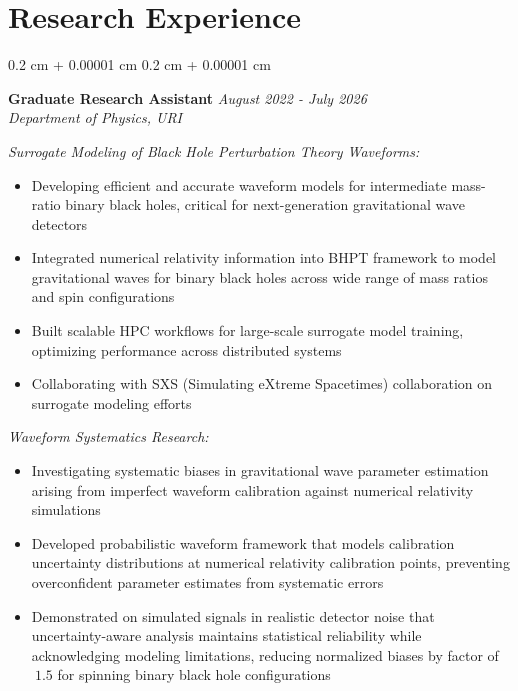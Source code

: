 \documentclass[10pt, letterpaper]{article}
\newenvironment{highlights}{
    \begin{itemize}[
        topsep=0.10 cm,
        parsep=0.10 cm,
        partopsep=0pt,
        itemsep=0pt,
        leftmargin=0.4 cm + 10pt
    ]
}{
    \end{itemize}
}
\newenvironment{onecolentry}{
    \begin{adjustwidth}{
        0.2 cm + 0.00001 cm
    }{
        0.2 cm + 0.00001 cm
    }
}{
    \end{adjustwidth}
}
\begin{document}
\section{Research Experience}

\begin{onecolentry}
  \textbf{Graduate Research Assistant} \hfill \textit{August 2022 - July 2026}\\
  \textit{Department of Physics, URI}
  
  \vspace{0.1 cm}

  \textit{Surrogate Modeling of Black Hole Perturbation Theory Waveforms:}
  \begin{highlights}
    \item Developing efficient and accurate waveform models for intermediate mass-ratio 
    binary black holes, critical for next-generation gravitational wave detectors
    \item Integrated numerical relativity information into BHPT framework to model 
    gravitational waves for binary black holes across wide range of mass ratios and spin 
    configurations
    \item Built scalable HPC workflows for large-scale surrogate model training, optimizing 
    performance across distributed systems
    \item Collaborating with SXS (Simulating eXtreme Spacetimes) collaboration on surrogate 
    modeling efforts
  \end{highlights}

  \vspace{0.2 cm}

  \textit{Waveform Systematics Research:}
  \begin{highlights}
    \item Investigating systematic biases in gravitational wave parameter estimation arising 
    from imperfect waveform calibration against numerical relativity simulations
    \item Developed probabilistic waveform framework that models calibration uncertainty 
    distributions at numerical relativity calibration points, preventing overconfident 
    parameter estimates from systematic errors
    \item Demonstrated on simulated signals in realistic detector noise that uncertainty-aware 
    analysis maintains statistical reliability while acknowledging modeling limitations, 
    reducing normalized biases by factor of $~1.5$ for spinning binary black hole configurations
  \end{highlights}
\end{onecolentry}
\end{document}
